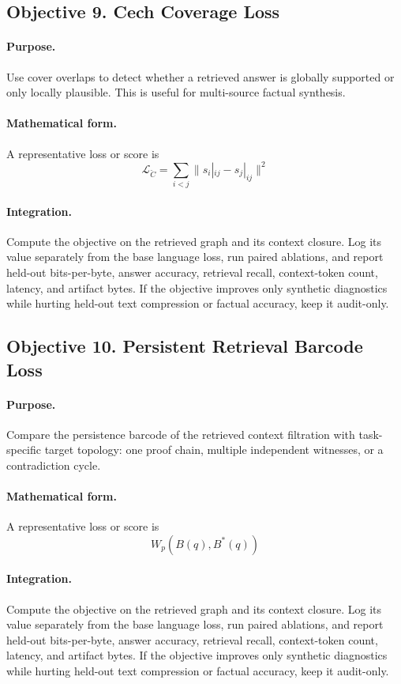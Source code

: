 \documentclass[11pt]{article}
\theoremstyle{definition}
\theoremstyle{remark}
\begin{document}
\subsection{Objective 9. Cech Coverage Loss}
\paragraph{Purpose.} Use cover overlaps to detect whether a retrieved answer is globally supported or only locally plausible. This is useful for multi-source factual synthesis.

\paragraph{Mathematical form.} A representative loss or score is
\[
    \mathcal L_{\check C}=\sum_{i<j}\|s_i|_{ij}-s_j|_{ij}\|^2
\]

\paragraph{Integration.} Compute the objective on the retrieved graph and its context closure. Log its value separately from the base language loss, run paired ablations, and report held-out bits-per-byte, answer accuracy, retrieval recall, context-token count, latency, and artifact bytes. If the objective improves only synthetic diagnostics while hurting held-out text compression or factual accuracy, keep it audit-only.


\subsection{Objective 10. Persistent Retrieval Barcode Loss}
\paragraph{Purpose.} Compare the persistence barcode of the retrieved context filtration with task-specific target topology: one proof chain, multiple independent witnesses, or a contradiction cycle.

\paragraph{Mathematical form.} A representative loss or score is
\[
    W_p(B(q),B^*(q))
\]

\paragraph{Integration.} Compute the objective on the retrieved graph and its context closure. Log its value separately from the base language loss, run paired ablations, and report held-out bits-per-byte, answer accuracy, retrieval recall, context-token count, latency, and artifact bytes. If the objective improves only synthetic diagnostics while hurting held-out text compression or factual accuracy, keep it audit-only.
\end{document}
